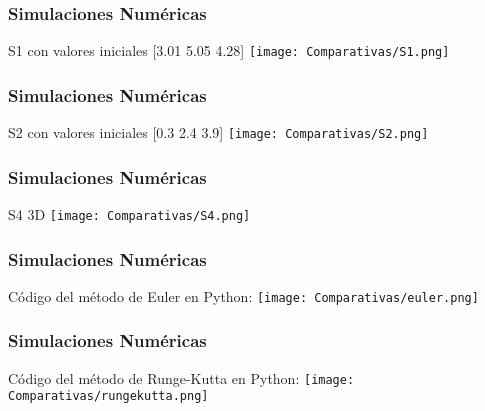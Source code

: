 \documentclass{beamer}
\begin{document}
\begin{frame}
	\frametitle{Simulaciones Num\'ericas}
	\begin{minipage}{10cm}
		S1 con valores iniciales [3.01 5.05 4.28]
		\centering
		\texttt{[image: Comparativas/S1.png]}
		
	\end{minipage}
\end{frame}

\begin{frame}
	\frametitle{Simulaciones Num\'ericas}
	\begin{minipage}{10cm}
		S2 con valores iniciales [0.3 2.4 3.9]
		\centering
		\texttt{[image: Comparativas/S2.png]}
		
	\end{minipage}
\end{frame}

\begin{frame}
	\frametitle{Simulaciones Num\'ericas}
	\begin{minipage}{10cm}
		S4 3D
		\centering
		\texttt{[image: Comparativas/S4.png]}
		
	\end{minipage}
\end{frame}


\begin{frame}
	\frametitle{Simulaciones Num\'ericas}
	\begin{minipage}{10cm}
		Código del método de Euler en Python:
		\centering
		\texttt{[image: Comparativas/euler.png]}
		
	\end{minipage}
\end{frame}

\begin{frame}
	\frametitle{Simulaciones Num\'ericas}
	\begin{minipage}{10cm}
		Código del método de Runge-Kutta en Python:
		\centering
		\texttt{[image: Comparativas/rungekutta.png]}
		
	\end{minipage}
\end{frame}

\end{document}
